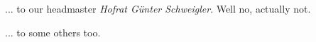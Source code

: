 \documentclass[
	fontsize=10pt, %
	twoside=false, %
	open=any, %
	numbers=noenddot, %
]{kaobook}
\begin{document}
... to our headmaster \textit{Hofrat Günter Schweigler}. Well no, actually not.

... to some others too.

\pagebreak


\backmatter %



\printbibliography[heading=bibintoc, title=Bibliography, prenote=bibnote] %




\renewcommand{\nomname}{Notation} %
\renewcommand{\nompreamble}{The next list describes several symbols that will be later used within the body of the document.} %



\end{document}
